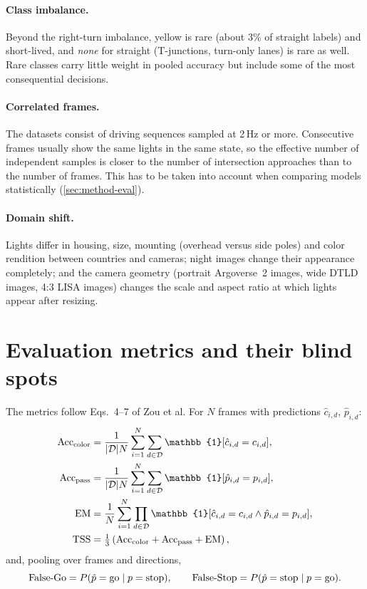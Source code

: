 \paragraph{Class imbalance.} Beyond the right-turn imbalance, yellow is rare (about 3\% of straight
labels) and short-lived, and \emph{none} for straight (T-junctions, turn-only lanes) is rare as well.
Rare classes carry little weight in pooled accuracy but include some of the most consequential
decisions.

\paragraph{Correlated frames.} The datasets consist of driving sequences sampled at 2\,Hz or more.
Consecutive frames usually show the same lights in the same state, so the effective number of
independent samples is closer to the number of intersection approaches than to the number of frames.
This has to be taken into account when comparing models statistically (\cref{sec:method-eval}).

\paragraph{Domain shift.} Lights differ in housing, size, mounting (overhead versus side poles) and
color rendition between countries and cameras; night images change their appearance completely; and
the camera geometry (portrait Argoverse~2 images, wide DTLD images, 4:3 LISA images) changes the scale
and aspect ratio at which lights appear after resizing.

\section{Evaluation metrics and their blind spots}
\label{sec:prob-metrics}

The metrics follow Eqs.~4--7 of Zou et al. For $N$ frames with predictions $\hat c_{i,d}$, $\hat
p_{i,d}$:
\begin{align}
  \acccolor &= \frac{1}{|\dirs|N}\sum_{i=1}^{N}\sum_{d\in\dirs} \mathbb{1}[\hat c_{i,d} = c_{i,d}], \\
  \accpass &= \frac{1}{|\dirs|N}\sum_{i=1}^{N}\sum_{d\in\dirs} \mathbb{1}[\hat p_{i,d} = p_{i,d}], \\
  \EM &= \frac{1}{N}\sum_{i=1}^{N} \prod_{d\in\dirs} \mathbb{1}[\hat c_{i,d}=c_{i,d} \wedge \hat p_{i,d}=p_{i,d}], \\
  \TSS &= \tfrac{1}{3}\left(\acccolor + \accpass + \EM\right),
\end{align}
and, pooling over frames and directions,
\begin{equation}
  \mathrm{False\text{-}Go} = P(\hat p = \text{go} \mid p = \text{stop}), \qquad \mathrm{False\text{-}Stop} = P(\hat p = \text{stop} \mid p = \text{go}).
\end{equation}


